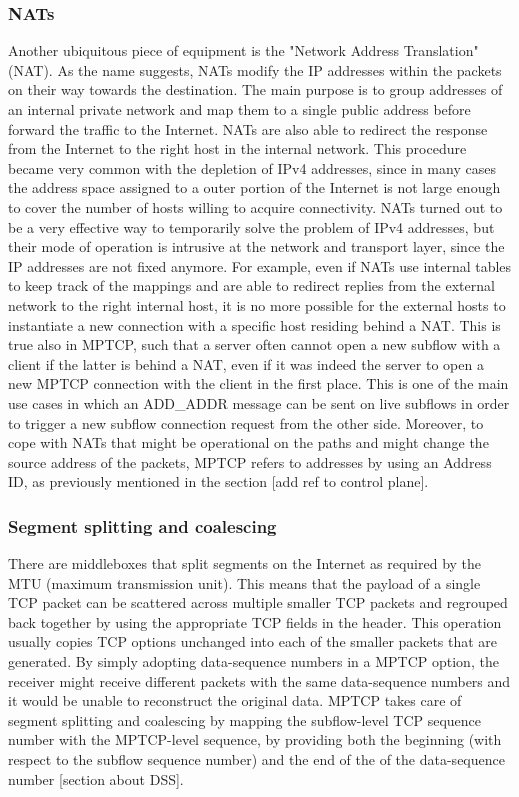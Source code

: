 \subsubsection{NATs}
Another ubiquitous piece of equipment is the "Network Address Translation" (NAT). As the name suggests, NATs modify the IP addresses within the packets on their way towards the destination. The main purpose is to group addresses of an internal private network and map them to a single public address before forward the traffic to the Internet. NATs are also able to redirect the response from the Internet to the right host in the internal network.
This procedure became very common with the depletion of IPv4 addresses, since in many cases the address space assigned to a outer portion of the Internet is not large enough to cover the number of hosts willing to acquire connectivity. 
NATs turned out to be a very effective way to temporarily solve the problem of IPv4 addresses, but their mode of operation is intrusive at the network and transport layer, since the IP addresses are not fixed anymore.
For example, even if NATs use internal tables to keep track of the mappings and are able to redirect replies from the external network to the right internal host, it is no more possible for the external hosts to instantiate a new connection with a specific host residing behind a NAT. This is true also in MPTCP, such that a server often cannot open a new subflow with a client if the latter is behind a NAT, even if it was indeed the server to open a new MPTCP connection with the client in the first place. This is one of the main use cases in which an ADD\_ADDR message can be sent on live subflows in order to trigger a new subflow connection request from the other side.
Moreover, to cope with NATs that might be operational on the paths and might change the source address of the packets, MPTCP refers to addresses by using an Address ID, as previously mentioned in the section [add ref to control plane]. 

\subsubsection{Segment splitting and coalescing}
There are middleboxes that split segments on the Internet as required by the MTU (maximum transmission unit). This means that the payload of a single TCP packet can be scattered across multiple smaller TCP packets and regrouped back together by using the appropriate TCP fields in the header. This operation usually copies TCP options unchanged into each of the smaller packets that are generated. By simply adopting data-sequence numbers in a MPTCP option, the receiver might receive different packets with the same data-sequence numbers and it would be unable to reconstruct the original data. MPTCP takes care of segment splitting and coalescing by mapping the subflow-level TCP sequence number with the MPTCP-level sequence, by providing both the beginning (with respect to the subflow sequence number) and the end of the of the data-sequence number [section about DSS].

